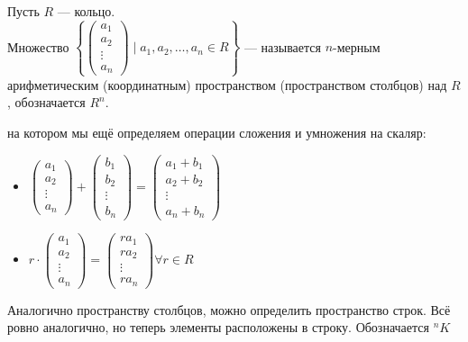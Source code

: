 \begin{definition}
    Пусть $R$ --- кольцо. \\
    Множество $\left\{ \begin{pmatrix} a_1 \\ a_2 \\ \vdots \\ a_n \end{pmatrix} \mid a_1, a_2, \ldots, a_n \in R\right\}$ --- называется $n$-мерным арифметическим (координатным) пространством (пространством столбцов) над $R$, обозначается $R^n$.

    на котором мы ещё определяем операции сложения и умножения на скаляр:
    \begin{itemize}
        \item $\begin{pmatrix} a_1 \\ a_2 \\ \vdots \\ a_n \end{pmatrix} + \begin{pmatrix} b_1 \\ b_2 \\ \vdots \\ b_n \end{pmatrix} = \begin{pmatrix} a_1 + b_1\\ a_2 + b_2 \\ \vdots \\ a_n + b_n \end{pmatrix}$ 
        \item $r \cdot \begin{pmatrix} a_1 \\ a_2 \\ \vdots \\ a_n \end{pmatrix} = \begin{pmatrix} ra_1 \\ ra_2 \\ \vdots \\ ra_n \end{pmatrix} \forall r \in R$  
    \end{itemize}
\end{definition}
\begin{definition}
	Аналогично пространству столбцов, можно определить пространство строк. Всё ровно аналогично, но теперь элементы расположены в строку. Обозначается ${}^n K$
\end{definition}
